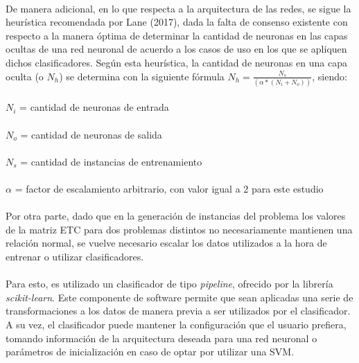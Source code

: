 \paragraph{} De manera adicional, en lo que respecta a la arquitectura de las redes, se sigue la heurística recomendada por Lane (2017), dada la falta de consenso existente con respecto a la manera óptima de determinar la cantidad de neuronas en las capas ocultas de una red neuronal de acuerdo a los casos de uso en los que se apliquen dichos clasificadores. Según esta heurística, la cantidad de neuronas en una capa oculta (o $N_h$) se determina con la siguiente fórmula $N_h = \frac{N_s} {(\alpha * (N_i + N_o))}$, siendo:

\paragraph{} $N_i$ = cantidad de neuronas de entrada
\paragraph{}$N_o$ = cantidad de neuronas de salida
\paragraph{}$N_s$ = cantidad de instancias de entrenamiento
\paragraph{}$\alpha$ = factor de escalamiento arbitrario, con valor igual a 2 para este estudio

\paragraph{} Por otra parte, dado que en la generación de instancias del problema los valores de la matriz ETC para dos problemas distintos no necesariamente mantienen una relación normal, se vuelve necesario escalar los datos utilizados a la hora de entrenar o utilizar clasificadores.

\paragraph{} Para esto, es utilizado un clasificador de tipo \textit{pipeline}, ofrecido por la librería \textit{scikit-learn}. Este componente de software permite que sean aplicadas una serie de transformaciones a los datos de manera previa a ser utilizados por el clasificador. A su vez, el clasificador puede mantener la configuración que el usuario prefiera, tomando información de la arquitectura deseada para una red neuronal o parámetros de inicialización en caso de optar por utilizar una SVM. 

